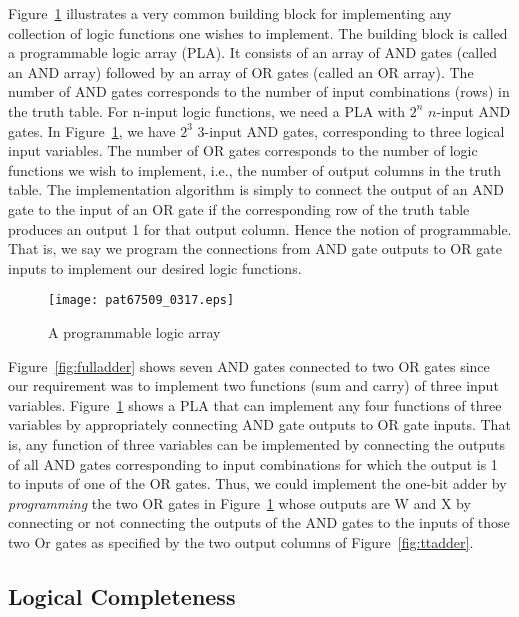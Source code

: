 \documentclass{patt}
\begin{document}
Figure~\ref{fig:pla} illustrates a very common building block for implementing
any collection of logic functions one wishes to implement.  The building block
is called a programmable logic array (PLA).  It consists of an array
of AND gates (called an AND array) followed by an array of OR gates
(called an OR array).  The number of AND gates corresponds to the
number of input combinations (rows) in the truth table.  For n-input
logic functions, we need a PLA with $2^n$ $n$-input AND gates.  In
Figure~\ref{fig:pla}, we have $2^3$ 3-input AND gates, corresponding to
three logical input variables.  The number of OR gates
corresponds to the number of logic functions we wish to implement, i.e., the
number of output columns in the truth table.  The
implementation algorithm is simply to connect the output of an AND
gate to the input of an OR gate if the corresponding row of the truth
table produces an output 1 for that output column.  Hence the notion
of programmable.  That is, we say we program the connections from AND
gate outputs to OR gate inputs to implement our desired logic functions.

\begin{figure}
\centerline{\texttt{[image: pat67509\_0317.eps]}}
\caption{A programmable logic array}
\label{fig:pla}
\end{figure}

Figure~\ref{fig:fulladder} shows seven AND gates connected to two OR gates 
since our requirement was to implement two functions (sum and carry) of
three input variables.  Figure~\ref{fig:pla} shows a PLA that can implement
any four functions of three variables by
appropriately connecting AND gate outputs to OR gate inputs.  That is, any
function of three variables can be implemented by connecting the outputs of
all AND gates corresponding to input combinations for which the output is 1
to inputs of one of the OR gates.  Thus, we could implement the one-bit adder 
by {\em programming} the two OR gates
in Figure~\ref{fig:pla} whose outputs are W and X by connecting 
or not connecting the outputs of the AND gates to the inputs of those two
Or gates as specified by the two output columns of Figure~\ref{fig:ttadder}.
\vadjust{\pagebreak}

\FloatBarrier
\subsection{Logical Completeness}
\end{document}
